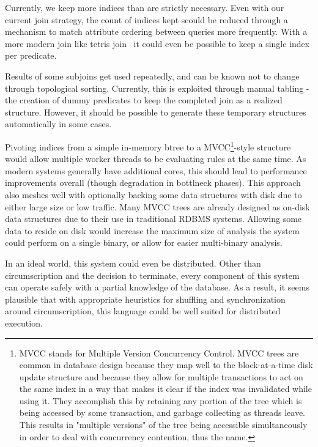 Currently, we keep more indices than are strictly necessary.
Even with our current join strategy, the count of indices kept scould be reduced through a mechanism to match attribute ordering between queries more frequently.
With a more modern join like tetris join~\cite{tetris} it could even be possible to keep a single index per predicate.

Results of some subjoins get used repeatedly, and can be known not to change through topological sorting.
Currently, this is exploited through manual tabling - the creation of dummy predicates to keep the completed join as a realized structure.
However, it should be possible to generate these temporary structures automatically in some cases.

Pivoting indices from a simple in-memory btree to a MVCC\footnote{
	MVCC stands for Multiple Version Concurrency Control.
	MVCC trees are common in database design because they map well to the block-at-a-time disk update structure and because they allow for multiple transactions to act on the same index in a way that makes it clear if the index was invalidated while using it.
	They accomplish this by retaining any portion of the tree which is being accessed by some transaction, and garbage collecting as threads leave.
	This results in "multiple versions" of the tree being accessible simultaneously in order to deal with concurrency contention, thus the name.
}-style structure would allow multiple worker threads to be evaluating rules at the same time.
As modern systems generally have additional cores, this should lead to performance improvements overall (though degradation in bottlneck phases).
This approach also meshes well with optionally backing some data structures with disk due to either large size or low traffic.
Many MVCC trees are already designed as on-disk data structures due to their use in traditional RDBMS systems.
Allowing some data to reside on disk would increase the maximum size of analysis the system could perform on a single binary, or allow for easier multi-binary analysis.

In an ideal world, this system could even be distributed.
Other than circumscription and the decision to terminate, every component of this system can operate safely with a partial knowledge of the database.
As a result, it seems plausible that with appropriate heuristics for shuffling and synchronization around circumscription, this language could be well suited for distributed execution.
